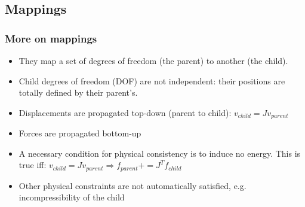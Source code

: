 \documentclass[a4paper,compress]{beamer}
\begin{document}
\subsection{Mappings}

\begin{frame}
\frametitle{More on mappings}
\begin{itemize}
 \item They map a set of degrees of freedom (the parent) to another (the child).
 \item Child degrees of freedom (DOF) are not independent: their positions are totally defined by their parent's.
 \item Displacements are propagated top-down (parent to child): $v_{child} = Jv_{parent}$
 \item Forces are propagated bottom-up
 \item A necessary condition for physical consistency is to induce no energy. This is true iff: $v_{child} = Jv_{parent} \Rightarrow f_{parent} += J^T f_{child}$
 \item Other physical constraints are not automatically satisfied, e.g. incompressibility of the child
\end{itemize}

\end{frame}
\end{document}
